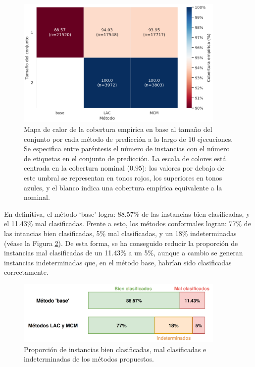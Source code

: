 \begin{figure}[h]
    \centering
    \includegraphics[width=0.9\textwidth]{apendices/imagenes/SE-heatmap_EC_by_PSS.png}
    \caption[
        Problema de estimación de sexo: 
        Mapa de calor de la cobertura empírica en base al tamaño del conjunto por cada método de predicción a lo largo de 10 ejecuciones.
    ]{
        Mapa de calor de la cobertura empírica en base al tamaño del conjunto por cada método de predicción a lo largo de 10 ejecuciones.
        Se especifica entre paréntesis el número de instancias con el número de etiquetas en el conjunto de predicción.
        La escala de colores está centrada en la cobertura nominal ($0.95$): los valores por debajo de este umbral se representan en tonos rojos, los superiores en tonos azules, y el blanco indica una cobertura empírica equivalente a la nominal.
    }
    \label{fig:SE-heatmap_EC_by_PSS}
\end{figure}

En definitiva, el método `base' logra: 88.57\% de las instancias bien clasificadas, y el 11.43\% mal clasificadas. Frente a esto, los métodos conformales logran: 77\% de las intancias bien clasificadas, 5\% mal clasificadas, y un 18\% indeterminadas (véase la Figura \ref{fig:SE-outputs_comparative}). De esta forma, se ha conseguido reducir la proporción de instancias mal clasificadas de un 11.43\% a un 5\%, aunque a cambio se generan instancias indeterminadas que, en el método base, habrían sido clasificadas correctamente.

\begin{figure}[h]
    \centering
    \includegraphics[width=0.9\textwidth]{apendices/imagenes/SE-outputs_comparative.png}
    \caption[
        Problema de estimación de sexo: 
        Proporción de instancias bien clasificadas, mal clasificadas e indeterminadas de los métodos propuestos.
    ]{
        Proporción de instancias bien clasificadas, mal clasificadas e indeterminadas de los métodos propuestos.
    }
    \label{fig:SE-outputs_comparative}
\end{figure}

